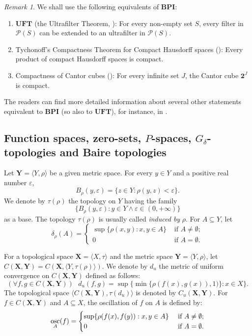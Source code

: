 \documentclass[12pt,twoside,leqno]{article}
\theoremstyle{plain}
\theoremstyle{definition}
\theoremstyle{remark}
\newtheorem{remark}[theorem]{Remark}
\DeclareMathOperator{\osc}{{\rm osc}}
\begin{document}
\begin{remark}
	\label{s1:r14}
	We shall use the following equivalents of $\mathbf{BPI}$:
	\begin{enumerate}
		\item[(i)] $\mathbf{UFT}$ (the Ultrafilter Theorem, \cite[Form 14A]{hr}): For every non-empty set $S$, every filter in $\mathcal{P}(S)$ can be extended to an ultrafilter in $\mathcal{P}(S)$.
		\item[(ii)] Tychonoff's Compactness Theorem for Compact Hausdorff spaces (\cite[Form 14J]{hr}): Every product of compact Hausdorff spaces is compact.
		\item[(iii)] Compactness of Cantor cubes (\cite[Form 14K]{hr}): For every infinite set $J$, the Cantor cube $\mathbf{2}^J$ is compact.
	\end{enumerate} 
	The readers can find more detailed information about several other statements equivalent to $\mathbf{BPI}$ (so also to $\mathbf{UFT}$), for instance, in \cite{her}.
\end{remark}

\subsection{Function spaces, zero-sets, $P$-spaces,  $G_{\delta}$-topologies and Baire topologies}
\label{s1.4}

Let  $\mathbf{Y}=\langle Y, \rho\rangle$ be a given metric space. For every $y\in Y$ and a positive real number $\varepsilon$, 
$$B_{\rho}(y, \varepsilon)=\{z\in Y: \rho(y,z)<\varepsilon\}.$$
We denote by $\tau(\rho)$ the topology on $Y$ having the family 
$$\{B_{\rho}(y, \varepsilon): y\in Y\wedge \varepsilon\in (0, +\infty)\}$$
as a base. The topology $\tau(\rho)$ is usually called \emph{induced by} $\rho$. For $A\subseteq Y$, let 
$$\delta_{\rho}(A)=\begin{cases}\sup\{ \rho(x,y): x,y\in A\} &\text{ if } A\neq\emptyset;\\
	0 &\text{ if } A=\emptyset.\end{cases}$$

For a topological space $\mathbf{X}=\langle X, \tau\rangle$ and the metric space $\mathbf{Y}=\langle Y, \rho\rangle$, let $C(\mathbf{X},\mathbf{Y})=C(\mathbf{X}, \langle Y, \tau(\rho)\rangle)$.  We denote by $d_u$ the metric of uniform convergence on $C(\mathbf{X},\mathbf{Y})$ defined as follows:
$$(\forall f, g\in C(\mathbf{X}, \mathbf{Y})) \text{ } d_u(f,g)=\sup\{ \min\{\rho (f(x), g(x)), 1)\}: x\in X\}.$$
The topological space $\langle C(\mathbf{X},\mathbf{Y}), \tau(d_u)\rangle$ is denoted by $C_{u}(\mathbf{X},\mathbf{Y})$.  For $f\in C(\mathbf{X},\mathbf{Y})$ and $A\subseteq X$, the oscillation of $f$ on $A$ is defined by:
$$\osc_A(f)=\begin{cases} \sup\{\rho(f(x), f(y)): x,y\in A\} &\text{ if } A\neq\emptyset;\\
	0 &\text{ if } A=\emptyset.\end{cases}$$
\end{document}
